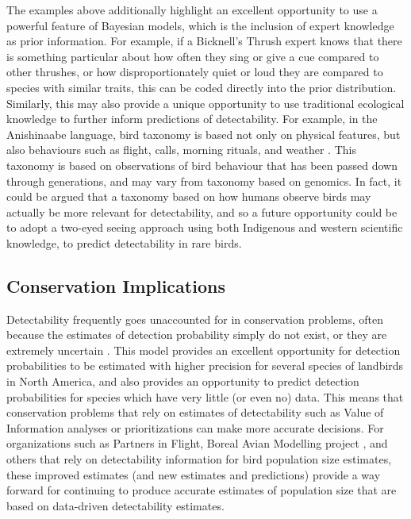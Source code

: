 \documentclass[12pt]{article}
\begin{document}
\par The examples above additionally highlight an excellent opportunity to use a powerful feature of Bayesian models, which is the inclusion of expert knowledge as prior information. 
For example, if a Bicknell’s Thrush expert knows that there is something particular about how often they sing or give a cue compared to other thrushes, or how disproportionately quiet or loud they are compared to species with similar traits, this can be coded directly into the prior distribution. 
Similarly, this may also provide a unique opportunity to use traditional ecological knowledge to further inform predictions of detectability.
For example, in the Anishinaabe language, bird taxonomy is based not only on physical features, but also behaviours such as flight, calls, morning rituals, and weather \citep{pitawanakwat_evening_2022}.
This taxonomy is based on observations of bird behaviour that has been passed down through generations, and may vary from taxonomy based on genomics.
In fact, it could be argued that a taxonomy based on how humans observe birds may actually be more relevant for detectability, and so a future opportunity could be to adopt a two-eyed seeing approach \cite{reid_twoeyed_2021} using both Indigenous and western scientific knowledge, to predict detectability in rare birds.

\subsection{Conservation Implications}
\par Detectability frequently goes unaccounted for in conservation problems, often because the estimates of detection probability simply do not exist, or they are extremely uncertain \citep{bennett_how_2023}.
This model provides an excellent opportunity for detection probabilities to be estimated with higher precision for several species of landbirds in North America, and also provides an opportunity to predict detection probabilities for species which have very little (or even no) data. 
This means that conservation problems that rely on estimates of detectability such as Value of Information analyses \citep{canessa_when_2015, bennett_when_2018} or prioritizations \citep{hanson_prioritizr_2023} can make more accurate decisions.
For organizations such as Partners in Flight, Boreal Avian Modelling project \citep{cumming_toward_2010}, and others that rely on detectability information for bird population size estimates, these improved estimates (and new estimates and predictions) provide a way forward for continuing to produce accurate estimates of population size that are based on data-driven detectability estimates.
\end{document}
